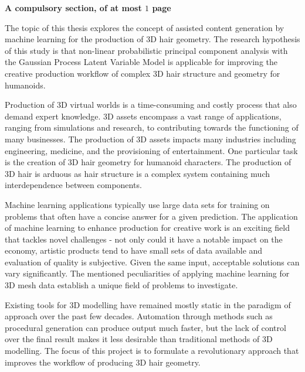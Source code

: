 \documentclass[ %
                    author={Dillon Keith Diep},
                supervisor={Dr. Carl Henrik Ek},
                    degree={MEng},
                     title={Assisted Content Generation for 3D Hair Geometry},
                  subtitle={[INCOMPLETE DRAFT, NOT FOR SUBMISSION]},
                      type={Research},
                      year={2014} ]{dissertation}
\begin{document}
{\bf A compulsory section, of at most $1$ page} 
\vspace{1cm} 

\noindent
The topic of this thesis explores the concept of assisted content generation by machine learning for the production of 3D hair geometry. The research hypothesis of this study is that non-linear probabilistic principal component analysis with the Gaussian Process Latent Variable Model is applicable for improving the creative production workflow of complex 3D hair structure and geometry for humanoids.

Production of 3D virtual worlds is a time-consuming and costly process that also demand expert knowledge. 3D assets encompass a vast range of applications, ranging from simulations and research, to contributing towards the functioning of many businesses. The production of 3D assets impacts many industries including engineering, medicine, and the provisioning of entertainment. One particular task is the creation of 3D hair geometry for humanoid characters. The production of 3D hair is arduous as hair structure is a complex system containing much interdependence between components.

Machine learning applications typically use large data sets for training on problems that often have a concise answer for a given prediction. The application of machine learning to enhance production for creative work is an exciting field that tackles novel challenges - not only could it have a notable impact on the economy, artistic products tend to have small sets of data available and evaluation of quality is subjective. Given the same input, acceptable solutions can vary significantly. The mentioned peculiarities of applying machine learning for 3D mesh data establish a unique field of problems to investigate.

Existing tools for 3D modelling have remained mostly static in the paradigm of approach over the past few decades. Automation through methods such as procedural generation can produce output much faster, but the lack of control over the final result makes it less desirable than traditional methods of 3D modelling. The focus of this project is to formulate a revolutionary approach that improves the workflow of producing 3D hair geometry.
\end{document}
